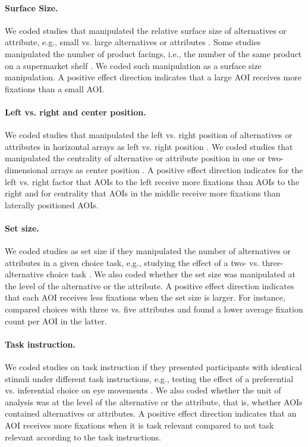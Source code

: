 \paragraph{Surface Size.} We coded studies that manipulated the relative surface size of alternatives or attribute, e.g., small vs. large alternatives or attributes \citep{lohse1997a}. Some studies manipulated the number of product facings, i.e., the number of the same product on a supermarket shelf \citep{chandon2009a}. We coded such manipulation as a surface size manipulation. A positive effect direction indicates that a large AOI receives more fixations than a small AOI.

\paragraph{Left vs. right and center position.} We coded studies that manipulated the left vs. right position of alternatives or attributes in horizontal arrays as left vs. right position \citep{kreplin2014a}. We coded studies that manipulated the centrality of alternative or attribute position in one or two-dimensional arrays as center position \citep[experiment 1A \& 1B in][]{atalay2012a,meissner2016a}. A positive effect direction indicates for the left vs. right factor that AOIs to the left receive more fixations than AOIs to the right and for centrality that AOIs in the middle receive more fixations than laterally positioned AOIs.

\paragraph{Set size.} We coded studies as set size if they manipulated the number of alternatives or attributes in a given choice task, e.g., studying the effect of a two- vs. three-alternative choice task \citep{hong2016a}. We also coded whether the set size was manipulated at the level of the alternative or the attribute. A positive effect direction indicates that each AOI receives less fixations when the set size is larger. For instance, \cite{grebitus2015} compared choices with three vs. five attributes and found a lower average fixation count per AOI in the latter.

\paragraph{Task instruction.} We coded studies on task instruction if they presented participants with identical stimuli under different task instructions, e.g., testing the effect of a preferential  vs. inferential choice on eye movements \citep{orquin2019a}. We also coded whether the unit of analysis was at the level of the alternative or the attribute, that is, whether AOIs contained alternatives or attributes. A positive effect direction indicates that an AOI receives more fixations when it is task relevant compared to not task relevant according to the task instructions.

